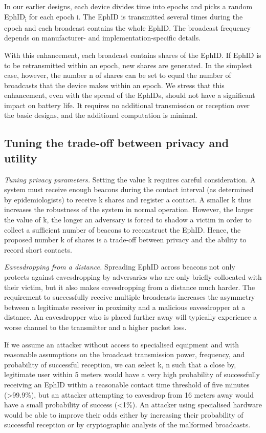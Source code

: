 \documentclass{article}
\begin{document}
In our earlier designs, each device divides time into epochs and picks a
random EphID\textsubscript{i} for each epoch i. The EphID is transmitted
several times during the epoch and each broadcast contains the whole
EphID. The broadcast frequency depends on manufacturer- and
implementation-specific details.

With this enhancement, each broadcast contains shares of the EphID. If
EphID is to be retransmitted within an epoch, new shares are generated.
In the simplest case, however, the number n of shares can be set to
equal the number of broadcasts that the device makes within an epoch. We
stress that this enhancement, even with the spread of the EphIDs, should
not have a significant impact on battery life. It requires no additional
transmission or reception over the basic designs, and the additional
computation is minimal.


\subsection{Tuning the trade-off between privacy and
utility}\label{tuning-the-trade-off-between-privacy-and-utility}

\emph{Tuning privacy parameters.} Setting the value k requires careful
consideration. A system must receive enough beacons during the contact
interval (as determined by epidemiologists) to receive k shares and
register a contact. A smaller k thus increases the robustness of the
system in normal operation. However, the larger the value of k, the
longer an adversary is forced to shadow a victim in order to collect a
sufficient number of beacons to reconstruct the EphID. Hence, the
proposed number k of shares is a trade-off between privacy and the
ability to record short contacts.

\emph{Eavesdropping from a distance.} Spreading EphID across beacons not
only protects against eavesdropping by adversaries who are only briefly
collocated with their victim, but it also makes eavesdropping from a
distance much harder. The requirement to successfully receive multiple
broadcasts increases the asymmetry between a legitimate receiver in
proximity and a malicious eavesdropper at a distance. An eavesdropper
who is placed further away will typically experience a worse channel to
the transmitter and a higher packet loss.

If we assume an attacker without access to specialised equipment and
with reasonable assumptions on the broadcast transmission power,
frequency, and probability of successful reception, we can select k, n
such that a close by, legitimate user within 5 meters would have a very
high probability of successfully receiving an EphID within a reasonable
contact time threshold of five minutes (\textgreater99.9\%), but an
attacker attempting to eavesdrop from 16 meters away would have a small
probability of success (\textless1\%). An attacker using specialised
hardware would be able to improve their odds either by increasing their
probability of successful reception or by cryptographic analysis of the
malformed broadcasts.
\end{document}
